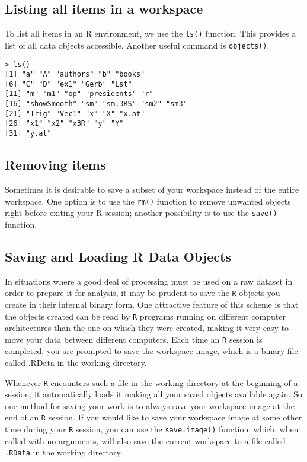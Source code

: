 \documentclass[a4paper,12pt]{article}
\begin{document}
\subsection{Listing all items in a workspace} %
To list all items in an R environment, we use the \texttt{ls()} function. This provides a list of all data objects accessible.
Another useful command is \texttt{objects()}.
\begin{verbatim}
> ls()
[1] "a" "A" "authors" "b" "books"
[6] "C" "D" "ex1" "Gerb" "Lst"
[11] "m" "m1" "op" "presidents" "r"
[16] "showSmooth" "sm" "sm.3RS" "sm2" "sm3"
[21] "Trig" "Vec1" "x" "X" "x.at"
[26] "x1" "x2" "x3R" "y" "Y"
[31] "y.at"
\end{verbatim}
\subsection{Removing items} %
Sometimes it is desirable to save a subset of your workspace instead of the entire workspace. One option is to use the \texttt{rm()} function to remove unwanted objects right before exiting your R session; another possibility is to use the \texttt{save()} function.

\subsection{Saving and Loading R Data Objects}
In situations where a good deal of processing must be used on a raw dataset in order to prepare it for analysis, it may be prudent to save the \texttt{R} objects you create in their internal binary form. One attractive feature of this scheme is that the objects created can be read by \texttt{R} programs running on different computer architectures than the one on which they were created, making it very easy to move your data between different computers.
Each time an \texttt{R} session is completed, you are prompted to save the workspace image, which is a binary file called .RData in the working directory.

Whenever \texttt{R} encounters such a file in the working directory at the beginning of a session, it automatically loads it making all your saved objects available again.
So one method for saving your work is to always save your workspace image at the end of an \texttt{R} session. If you would like to save your workspace image at some other time during your \texttt{R} session, you can use the \texttt{save.image()} function, which, when called with no arguments, will also save the current workspace to a file called \texttt{.RData} in the working directory.
\end{document}
